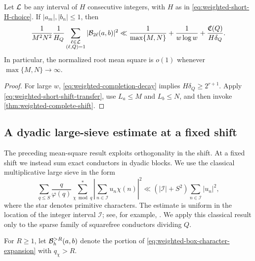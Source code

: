 \begin{corollary}
\label{cor:weighted-short-shift}
Let $\mathcal L$ be any interval of $H$ consecutive integers, with $H$ as in
\eqref{eq:weighted-short-H-choice}.  If $|a_m|,|b_n|\leq1$, then
\begin{align}
 \frac1{M^2N^2}
 \frac1{H_Q}
 \sum_{\substack{\ell\in\mathcal L\\(\ell,Q)=1}}
 |\mathcal B_{2\ell}(a,b)|^2
 \ll
 \frac1{\max\{M,N\}}+\frac1{w\log w}
 +\frac{\mathfrak C(Q)}{H\delta_Q}.
 \label{eq:weighted-short-bounded-coefficients}
\end{align}
In particular, the normalized root mean square is $o(1)$ whenever
$\max\{M,N\}\to\infty$.
\end{corollary}

\begin{proof}
For large $w$, \eqref{eq:weighted-completion-decay} implies
$H\delta_Q\geq2^{r+1}$.  Apply
\eqref{eq:weighted-short-shift-transfer}, use $L_a\leq M$ and
$L_b\leq N$, and then invoke
\cref{thm:weighted-complete-shift}.
\end{proof}

\subsection{A dyadic large-sieve estimate at a fixed shift}

The preceding mean-square result exploits orthogonality in the shift.  At a
fixed shift we instead sum exact conductors in dyadic blocks.  We use the
classical multiplicative large sieve in the form
\begin{equation}\label{eq:weighted-classical-multiplicative-large-sieve}
 \sum_{q\leq S}\frac q{\varphi(q)}
 \sum_{\chi\bmod q}^{*}
 \left|\sum_{n\in\mathcal I}u_n\chi(n)\right|^2
 \ll (|\mathcal I|+S^2)\sum_{n\in\mathcal I}|u_n|^2,
\end{equation}
where the star denotes primitive characters.  The estimate is uniform in
the location of the integer interval $\mathcal I$; see, for example,
\citet[Theorem~7.13]{IwaniecKowalski2004}.  We apply this classical result
only to the sparse family of squarefree conductors dividing $Q$.

For $R\geq1$, let $\mathcal B_h^{>R}(a,b)$ denote the portion of
\eqref{eq:weighted-box-character-expansion} with $q_\chi>R$.


